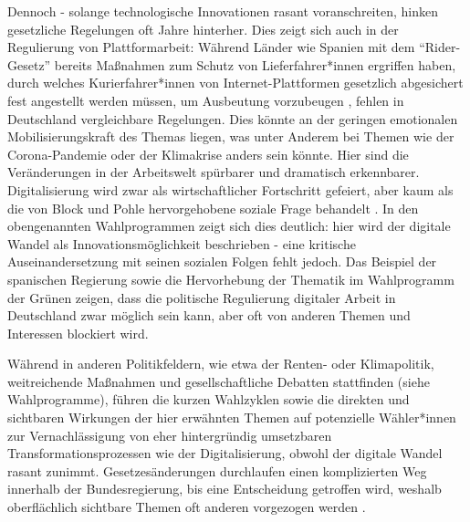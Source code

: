\documentclass[12pt]{article}
\begin{document}
Dennoch - solange technologische Innovationen rasant voranschreiten, hinken gesetzliche Regelungen oft Jahre hinterher. Dies zeigt sich auch in der Regulierung von Plattformarbeit: Während Länder wie Spanien mit dem \enquote{Rider-Gesetz} bereits Maßnahmen zum Schutz von Lieferfahrer*innen ergriffen haben, durch welches Kurierfahrer*innen von Internet-Plattformen gesetzlich abgesichert fest angestellt werden müssen, um Ausbeutung vorzubeugen \autocite[vgl.][]{schaaf_spanien_2021}, fehlen in Deutschland vergleichbare Regelungen. Dies könnte an der geringen emotionalen Mobilisierungskraft des Themas liegen, was unter Anderem bei Themen wie der Corona-Pandemie oder der Klimakrise anders sein könnte. Hier sind die Veränderungen in der Arbeitswelt spürbarer und dramatisch erkennbarer. Digitalisierung wird zwar als wirtschaftlicher Fortschritt gefeiert, aber kaum als die von Block und Pohle hervorgehobene soziale Frage behandelt \autocite[vgl.][190]{block_digitalisierung_2023}. In den obengenannten Wahlprogrammen zeigt sich dies deutlich: hier wird der digitale Wandel als Innovationsmöglichkeit beschrieben - eine kritische Auseinandersetzung mit seinen sozialen Folgen fehlt jedoch. Das Beispiel der spanischen Regierung sowie die Hervorhebung der Thematik im Wahlprogramm der Grünen zeigen, dass die politische Regulierung digitaler Arbeit in Deutschland zwar möglich sein kann, aber oft von anderen Themen und Interessen blockiert wird.

Während in anderen Politikfeldern, wie etwa der Renten- oder Klimapolitik, weitreichende Maßnahmen und gesellschaftliche Debatten stattfinden (siehe Wahlprogramme), führen die kurzen Wahlzyklen sowie die direkten und sichtbaren Wirkungen der hier erwähnten Themen auf potenzielle Wähler*innen zur Vernachlässigung von eher hintergründig umsetzbaren Transformationsprozessen wie der Digitalisierung, obwohl der digitale Wandel rasant zunimmt. Gesetzesänderungen durchlaufen einen komplizierten Weg innerhalb der Bundesregierung, bis eine Entscheidung getroffen wird, weshalb oberflächlich sichtbare Themen oft anderen vorgezogen werden \autocite[vgl.][]{bmj_bundesregierung_2025}.
\end{document}
